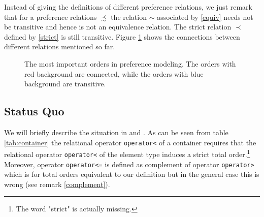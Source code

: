 ﻿\documentclass[a4paper,11pt,final]{article}
\newcommand{\tcode}[1]{\lstinline[basicstyle=\normalsize\ttfamily]{#1}}
\numberwithin{equation}{subsection}
\begin{document}
Instead of giving the definitions of different preference relations, we just remark that for a preference relations $\precsim$ the relation $\sim$ associated by \ref{equiv} needs not be transitive and hence is not an equivalence relation. The strict relation $\prec$ defined by \ref{strict} is still transitive. Figure \ref{fig:relations} shows the connections between different relations mentioned so far.
\begin{figure}[h!]
\centering
{}
\caption{The most important orders in preference modeling. The orders with \textcolor{DarkRed!50}{red background} are connected, while the orders with \textcolor{DarkSlateBlue!50}{blue background} are transitive.}
\label{fig:relations}
\end{figure}

\subsection{Status Quo}
We will briefly describe the situation in  and . As can be seen from table \ref{tab:container} the relational operator \tcode{operator<} of a container requires that the relational operator \tcode{operator<} of the element type induces a strict total order.\footnote{The word "strict" is actually missing.} Moreover, operator \tcode{operator<=} is defined as complement of operator \tcode{operator>} which is for total orders equivalent to our definition but in the general case this is wrong (see remark \ref{complement}).
\end{document}
